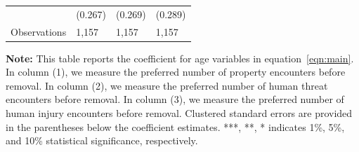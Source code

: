 \documentclass[english,12pt]{article}
\begin{document}
\begin{table}[H]
\begin{tabular}{@{}llll@{}}
            &     (0.267)   &     (0.269)   &     (0.289)   \\
        Observations & 1,157    &  1,157       & 1,157        \\\bottomrule
    \end{tabular}
    \begin{minipage}{.9\textwidth}
            \vspace{1em}
    \footnotesize{{\bf{Note:}} This table reports the coefficient for age variables in equation~\ref{eqn:main}. In column (1), we measure the preferred number of property encounters before removal. In column (2), we measure the preferred number of human threat encounters before removal. In column (3), we measure the preferred number of human injury encounters before removal. Clustered standard errors are provided in the parentheses below the coefficient estimates. ***, **, * indicates 1\%, 5\%, and 10\% statistical significance, respectively.}
    \label{tab: des_age}
    \end{minipage}
\end{table}
\end{document}
